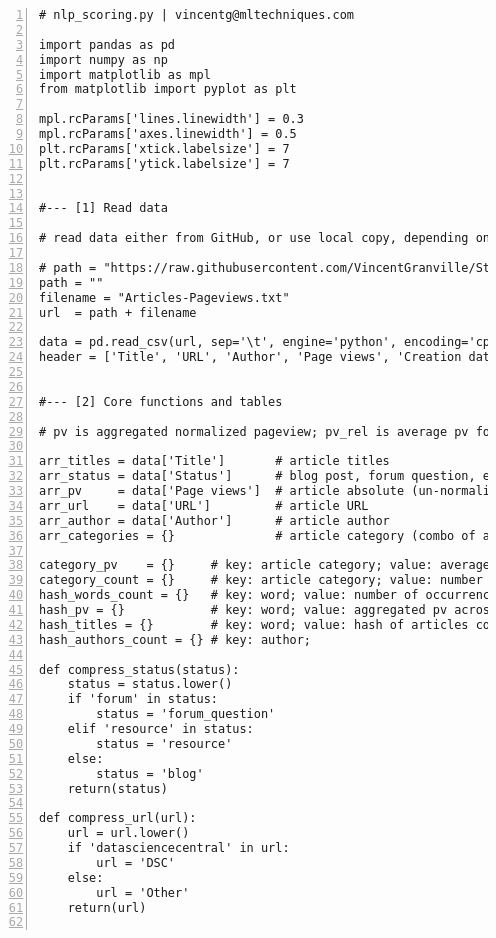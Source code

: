 \documentclass[oneside,10pt]{book}
\begin{document}
\begin{lstlisting}[numbers=left]
# nlp_scoring.py | vincentg@mltechniques.com

import pandas as pd
import numpy as np
import matplotlib as mpl
from matplotlib import pyplot as plt

mpl.rcParams['lines.linewidth'] = 0.3
mpl.rcParams['axes.linewidth'] = 0.5
plt.rcParams['xtick.labelsize'] = 7
plt.rcParams['ytick.labelsize'] = 7


#--- [1] Read data

# read data either from GitHub, or use local copy, depending on path

# path = "https://raw.githubusercontent.com/VincentGranville/Statistical-Optimization/main/"
path = ""
filename = "Articles-Pageviews.txt"
url  = path + filename

data = pd.read_csv(url, sep='\t', engine='python', encoding='cp1252')
header = ['Title', 'URL', 'Author', 'Page views', 'Creation date', 'Status']


#--- [2] Core functions and tables

# pv is aggregated normalized pageview; pv_rel is average pv for a specific group

arr_titles = data['Title']       # article titles
arr_status = data['Status']      # blog post, forum question, etc.
arr_pv     = data['Page views']  # article absolute (un-normalized) pageviews 
arr_url    = data['URL']         # article URL
arr_author = data['Author']      # article author
arr_categories = {}              # article category (combo of author, status, URL extracts) 

category_pv    = {}     # key: article category; value: average pv per category
category_count = {}     # key: article category; value: number of articles in that category
hash_words_count = {}   # key: word; value: number of occurrences across all articles 
hash_pv = {}            # key: word; value: aggregated pv across all those articles
hash_titles = {}        # key: word; value: hash of articles containing word (value: pv)
hash_authors_count = {} # key: author; 

def compress_status(status):
    status = status.lower()
    if 'forum' in status:
        status = 'forum_question'
    elif 'resource' in status:
        status = 'resource'
    else:
        status = 'blog'
    return(status)

def compress_url(url):
    url = url.lower()
    if 'datasciencecentral' in url:
        url = 'DSC'
    else:
        url = 'Other'
    return(url)


\end{lstlisting}
\end{document}
